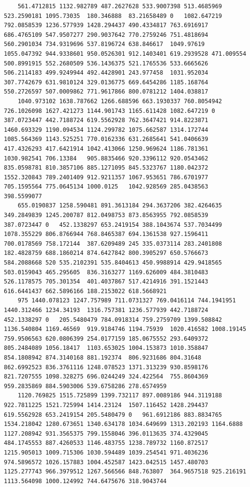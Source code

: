 \documentclass[UTF8]{ctexart}
\begin{document}
\begin{lstlisting}
	561.4712815	1132.982789	487.2627628	533.9007398	513.4685969	523.2590181	1095.73035	180.346888	83.21658489	0	1082.647219	792.0858539	1236.577939	1428.294437	490.4334817	763.6916917	686.4765109	547.9507277	290.9037642	770.2759246	751.4818694	560.2901034	734.9319696	537.8196724	638.846617	1049.97619	1055.047392	944.9338601	950.0526301	912.1403401	619.2939528	471.009554	500.8991915	552.2680509	536.1436375	521.1765536	533.6665626	506.2114183	499.9249944	492.4428901	243.977458	1031.952034	307.7742679	631.9810124	329.0136775	669.6454286	1185.168764	550.2726597	507.0009862	771.9617866	800.0781212	1404.038817
	1040.973102	1638.787662	1266.688596	663.1930337	760.8054942	726.1026098	1627.421273	1144.901743	1165.611428	1082.647219	0	387.0723447	442.7188724	619.5562928	762.3647421	914.8223871	1460.693329	1190.094534	1124.299782	1075.662587	1314.172744	1085.564369	1143.525251	770.0162336	631.2685641	541.0406639	417.4326293	417.6421914	1042.413066	1250.969624	1186.781361	1030.982541	706.13384	905.8835466	920.3396112	920.0543462	835.0598781	810.3857106	885.1271095	845.5323767	1180.042372	1552.320843	789.2401409	912.9211357	1067.953651	786.6701977	705.1595564	775.0645134	1000.0125	1042.928569	285.0438563	398.5599077
	655.0190837	1258.590481	891.3613184	294.3637206	382.4264635	349.2849839	1245.200787	812.0498753	873.8563955	792.0858539	387.0723447	0	452.1338297	653.2419154	388.1043674	537.7034499	1078.355229	806.8766944	768.8465387	694.1361538	927.1596411	700.0178569	758.172144	387.6209489	245	335.0373114	283.2401808	182.4828759	688.1860214	874.6427842	800.3905297	650.5766673	584.2088668	520	535.2102391	535.8404613	450.9988914	429.9418565	503.0159043	465.295605	836.3163277	1169.626009	484.3810483	526.1178575	705.301354	401.4037867	517.4214916	391.1521443	616.6441437	662.5896166	188.2153022	618.5668921
	975	1440.078123	1247.757989	711.0731327	769.0416114	744.1941951	1440.312466	1234.34193	1316.757381	1236.577939	442.7188724	452.1338297	0	205.5480479	784.0918314	759.2759709	1399.508842	1136.540804	1169.46569	919.9184746	1194.75939	1020.416582	1008.19145	759.9506563	620.0806399	254.0177159	185.0675552	293.6409372	805.2484089	1056.18417	1103.653025	1004.153873	1010.358847	854.1808942	874.3140168	881.192374	806.9231686	804.31648	862.6992523	836.3761116	1248.078523	1371.313239	930.8598176	821.7207555	1098.328275	696.0244249	324.422564	755.8604369	959.2835869	884.5903006	539.6758286	278.6574959
	1120.769825	1515.725899	1399.732117	897.0089186	944.3119188	922.7811225	1521.725994	1414.23124	1507.116452	1428.294437	619.5562928	653.2419154	205.5480479	0	961.6912186	883.8834765	1534.218042	1280.673651	1340.634178	1034.649699	1313.202193	1164.6888	1127.208942	931.3565375	799.1558046	396.0113635	374.4329045	484.1745553	887.4260533	1146.483755	1238.789732	1160.872517	1215.905013	1009.715306	1030.594489	1039.254541	971.4036236	974.5896572	1026.157883	1004.452587	1423.042515	1457.480703	1125.277743	966.3979512	1267.566566	848.763807	364.9657518	925.216191	1113.564098	1000.124992	744.6475676	318.9043744

\end{lstlisting}
\end{document}
